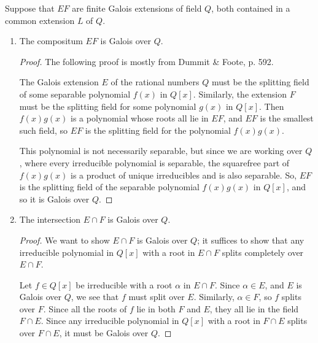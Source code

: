 \documentclass[12pt]{article}
\theoremstyle{definition}
\newenvironment{problem}[2][Problem]{\begin{trivlist}
\item[\hskip \labelsep {\bfseries #1}\hskip \labelsep {\bfseries #2.}]}{\end{trivlist}}
\begin{document}
\begin{problem}{3}
	Suppose that $EF$ are finite Galois extensions of field $Q$, both contained in a common extension $L$ of $Q$. 
	\begin{enumerate}[label=(\alph*)]
		\item The compositum $EF$ is Galois over $Q$.
			\begin{proof}
				The following proof is mostly from Dummit \& Foote, p. 592.
				\par The Galois extension $E$ of the rational numbers $Q$ must be the splitting field of some separable polynomial $f(x)$ in $Q[x]$. Similarly, the extension $F$ must be the splitting field for some polynomial $g(x)$ in $Q[x]$. Then $f(x)g(x)$ is a polynomial whose roots all lie in $EF$, and $EF$ is the smallest such field, so $EF$ is the splitting field for the polynomial $f(x)g(x)$.
				\par This polynomial is not necessarily separable, but since we are working over $Q$, where every irreducible polynomial is separable, the squarefree part of $f(x)g(x)$ is a product of unique irreducibles and is also separable. So, $EF$ is the splitting field of the separable polynomial $f(x)g(x)$ in $Q[x]$, and so it is Galois over $Q$.
			\end{proof}
		\item The intersection $E \cap F$ is Galois over $Q$.
			\begin{proof}
				We want to show $E \cap F$ is Galois over $Q$; it suffices to show that any irreducible polynomial in $Q[x]$ with a root in $E \cap F$ splits completely over $E \cap F$.
				\par Let $f \in Q[x]$ be irreducible with a root $ \alpha$ in $E \cap F$. Since $\alpha \in E$, and $E$ is Galois over $Q$, we see that $f$ must split over $E$. Similarly, $\alpha \in F$, so $f$ splits over $F$. Since all the roots of $f$ lie in both $F$ and $E$, they all lie in the field $F \cap E$. Since any irreducible polynomial in $Q[x]$ with a root in $F \cap E$ splits over $F \cap E$, it must be Galois over $Q$.
			\end{proof}
	\end{enumerate}
\end{problem}
\end{document}
